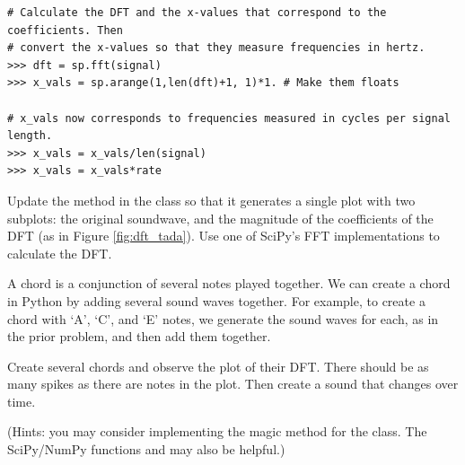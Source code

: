 \begin{lstlisting}
# Calculate the DFT and the x-values that correspond to the coefficients. Then
# convert the x-values so that they measure frequencies in hertz.
>>> dft = sp.fft(signal)
>>> x_vals = sp.arange(1,len(dft)+1, 1)*1. # Make them floats

# x_vals now corresponds to frequencies measured in cycles per signal length.
>>> x_vals = x_vals/len(signal)
>>> x_vals = x_vals*rate
\end{lstlisting}

\begin{problem}
Update the  method in the  class so that it generates a single plot with two subplots: the original soundwave, and the magnitude of the coefficients of the DFT (as in Figure \ref{fig:dft_tada}).
Use one of SciPy's FFT implementations to calculate the DFT.
\end{problem}

\begin{problem}
A chord is a conjunction of several notes played together.
We can create a chord in Python by adding several sound waves together.
For example, to create a chord with `A', `C', and `E' notes, we generate the sound waves for each, as in the prior problem, and then add them together.

Create several chords and observe the plot of their DFT.
There should be as many spikes as there are notes in the plot.
Then create a sound that changes over time.

(Hints: you may consider implementing the  magic method for the  class.
The SciPy/NumPy functions  and  may also be helpful.)
\end{problem}


